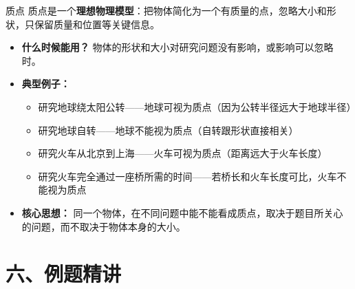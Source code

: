 \begin{conceptbox}{质点}
质点是一个\textbf{理想物理模型}：把物体简化为一个有质量的点，忽略大小和形状，只保留质量和位置等关键信息。

\begin{itemize}
  \item \textbf{什么时候能用？} 物体的形状和大小对研究问题没有影响，或影响可以忽略时。
  \item \textbf{典型例子：}
    \begin{itemize}
      \item 研究地球绕太阳公转——地球可视为质点（因为公转半径远大于地球半径）
      \item 研究地球自转——地球不能视为质点（自转跟形状直接相关）
      \item 研究火车从北京到上海——火车可视为质点（距离远大于火车长度）
      \item 研究火车完全通过一座桥所需的时间——若桥长和火车长度可比，火车不能视为质点
    \end{itemize}
  \item \textbf{核心思想：} 同一个物体，在不同问题中能不能看成质点，取决于题目所关心的问题，而不取决于物体本身的大小。
\end{itemize}
\end{conceptbox}

\nopagebreak[4]
\section*{六、例题精讲}

